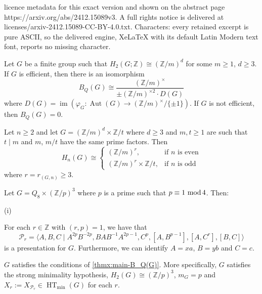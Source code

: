 \documentclass[10pt,a4paper]{amsart}
\DeclareMathOperator{\Aut}{Aut}
\DeclareMathOperator{\HT}{HT}
\DeclareMathOperator{\IM}{im}
\newcommand{\Z}{\mathbb{Z}}
\newcommand{\cy}[1]{\Z/{#1}}
\renewcommand{\mod}{\,\,\text{\normalfont mod}\,}
\begin{document}
licence metadata for this exact version and shown on the abstract page https://arxiv.org/abs/2412.15089v3. A full rights notice is delivered at licenses/arxiv-2412.15089-CC-BY-4.0.txt. Characters: every retained excerpt is pure ASCII, so the delivered engine, XeLaTeX with its default Latin Modern text font, reports no missing character.
\begin{thmx} \label{thmx:main-B_Q(G)}
Let $G$ be a finite group such that $H_2(G;\Z) \cong (\Z/m)^d$ 
for some $m\geq 1$, $d \ge 3$.  If $G$ is efficient, then there is an isomorphism
\[ B_Q(G) \cong \frac{(\Z/m)^\times}{\pm (\cy m)^{\times 2} \cdot D(G)}\]
where $D(G) = \IM(\varphi_G\colon  \Aut(G) \to  (\Z/m)^\times/\{\pm 1\})$. If $G$ is not efficient, then $B_Q(G)=0$.
\end{thmx}

\begin{lemma} \label{lemma:H_n(G)}
Let $n \ge 2$ and let $G = (\Z / m)^d \times \Z /t $ where $d \geq 3$ and $m, t \ge 1$ are such that $t \mid m$ and $m$, $m/t$ have the same prime factors.
Then
\[
H_n(G) \cong \begin{cases} (\Z/m)^r, & \text{if $n$ is even} \\
 (\Z/m)^r \times \Z/t, & \text{if $n$ is odd}	
 \end{cases}
\]
where $r = r_{(G,n)} \geq 3$.
\end{lemma}

\begin{lemma} \label{lemma:Q8-presentations}
Let $G = Q_8 \times (\Z/p)^3$ where $p$ is a prime such that $p \equiv 1 \mod 4$. Then:
\begin{clist}{(i)}
\item
For each $r \in \Z$ with $(r,p)=1$, we have that
\[ \mathcal{P}_r = \langle A, B, C \mid A^{2p}B^{-2p}, BAB^{-1}A^{2p-1}, C^p, [A,B^{p-1}], [A,C^r], [B,C]\rangle\]
is a presentation for $G$. Furthermore, we can identify $A=xa$, $B=yb$ and $C=c$.
\item
$G$ satisfies the conditions of \cref{thmx:main-B_Q(G)}. More specifically, $G$ satisfies the strong minimality hypothesis, $H_2(G) \cong (\Z/p)^3$, $m_G = p$ and $X_r := X_{\mathcal{P}_r} \in \HT_{\min}(G)$ for each $r$.
\end{clist}
\end{lemma}
\end{document}
